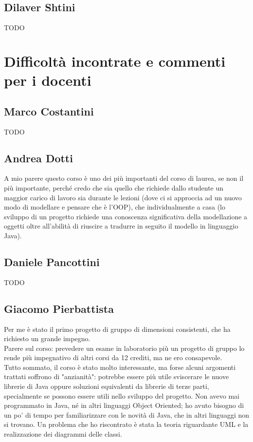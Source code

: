 \documentclass[a4paper,12pt]{report}
\begin{document}
\subsection*{Dilaver Shtini}
{TODO}


\section{Difficoltà incontrate e commenti per i docenti}
\subsection*{Marco Costantini}
{TODO}

\subsection*{Andrea Dotti}
A mio parere questo corso è uno dei più importanti del corso di laurea, se non il più importante, perché credo che sia quello che richiede dallo studente un maggior carico di lavoro sia durante le lezioni (dove ci si approccia ad un nuovo modo di modellare e pensare che è l'OOP), che individualmente a casa (lo sviluppo di un progetto richiede una conoscenza significativa della modellazione a oggetti oltre all'abilità di riuscire a tradurre in seguito il modello in linguaggio Java).

\subsection*{Daniele Pancottini}
{TODO}

\subsection*{Giacomo Pierbattista}
Per me è stato il primo progetto di gruppo di dimensioni consistenti, che ha richiesto un grande impegno. 
\\Parere sul corso: prevedere un esame in laboratorio più un progetto di gruppo lo rende più
impegnativo di altri corsi da 12 crediti, ma ne ero consapevole. 
\\Tutto sommato, il corso è stato molto interessante, ma forse alcuni argomenti trattati soffrono di "anzianità":
potrebbe essere più utile sviscerare le nuove librerie di Java oppure soluzioni equivalenti da librerie di terze parti,
specialmente se possono essere utili nello sviluppo del progetto.
Non avevo mai programmato in Java, né in altri linguaggi Object Oriented; ho avuto bisogno 
di un po' di tempo per familiarizzare con le novità di Java, che in altri linguaggi non si trovano.
Un problema che ho riscontrato è stata la teoria riguardante UML e la realizzazione dei diagrammi delle classi.
\end{document}
